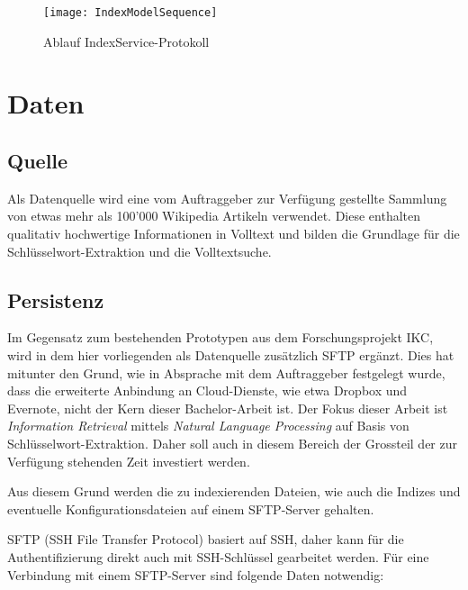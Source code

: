     \begin{figure}[H]
    \centering
    \texttt{[image: IndexModelSequence]}
    \caption{Ablauf IndexService-Protokoll}
    \label{fig:seqindexprotocol}
    \end{figure}


\section{Daten}
    
\subsection{Quelle}

Als Datenquelle wird eine vom Auftraggeber zur Verfügung gestellte Sammlung von etwas mehr als 100'000 Wikipedia Artikeln verwendet. Diese enthalten qualitativ hochwertige Informationen in Volltext und bilden die Grundlage für die Schlüsselwort-Extraktion und die Volltextsuche.

\subsection{Persistenz}

Im Gegensatz zum bestehenden Prototypen aus dem Forschungsprojekt \gls{IKC}, wird in dem hier vorliegenden als Datenquelle zusätzlich \gls{SFTP} ergänzt. Dies hat mitunter den Grund, wie in Absprache mit dem Auftraggeber festgelegt wurde, dass die erweiterte Anbindung an Cloud-Dienste, wie etwa Dropbox und Evernote, nicht der Kern dieser Bachelor-Arbeit ist. Der Fokus dieser Arbeit ist \textit{Information Retrieval} mittels \textit{Natural Language Processing} auf Basis von Schlüsselwort-Extraktion. Daher soll auch in diesem Bereich der Grossteil der zur Verfügung stehenden Zeit investiert werden. 

Aus diesem Grund werden die zu indexierenden Dateien, wie auch die Indizes und eventuelle Konfigurationsdateien auf einem \gls{SFTP}-Server gehalten.

\gls{SFTP} (SSH File Transfer Protocol) basiert auf \gls{SSH}, daher kann für die Authentifizierung direkt auch mit \gls{SSH}-Schlüssel gearbeitet werden. Für eine Verbindung mit einem \gls{SFTP}-Server sind folgende Daten notwendig:


